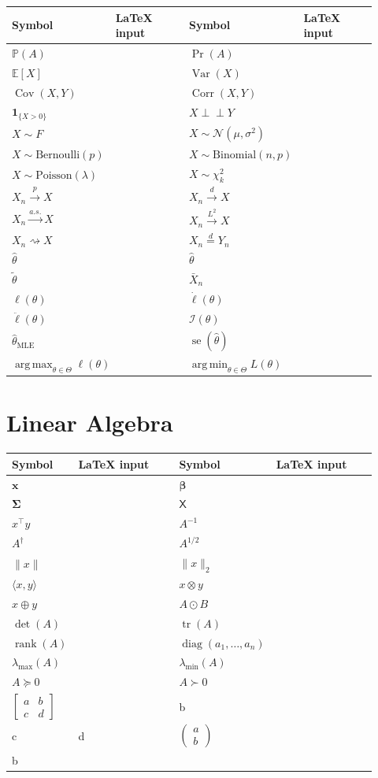 \documentclass[10pt]{article}
\DeclareMathOperator{\Var}{Var}
\DeclareMathOperator{\Cov}{Cov}
\DeclareMathOperator{\Corr}{Corr}
\DeclareMathOperator{\diag}{diag}
\DeclareMathOperator{\rank}{rank}
\DeclareMathOperator{\tr}{tr}
\DeclareMathOperator{\se}{se}
\DeclareMathOperator*{\argmax}{arg\,max}
\DeclareMathOperator*{\argmin}{arg\,min}
\newcommand{\indep}{\mathrel{\perp\!\!\!\perp}}
\newcommand{\code}[1]{\texttt{\detokenize{#1}}}
\newcommand{\srow}[4]{$#1$ & \code{#2} & $#3$ & \code{#4}\\}
\newenvironment{symtable}
{\small\begin{longtable}{
  >{\centering\arraybackslash}p{0.12\linewidth}
  >{\raggedright\arraybackslash}p{0.34\linewidth}
  >{\centering\arraybackslash}p{0.12\linewidth}
  >{\raggedright\arraybackslash}p{0.34\linewidth}}
  \toprule
  \textbf{Symbol} & \textbf{LaTeX input} &
  \textbf{Symbol} & \textbf{LaTeX input}\\
  \midrule
  \endhead}
{\bottomrule\end{longtable}}
\begin{document}
\begin{symtable}
\srow{\mathbb{P}(A)}{\mathbb{P}(A)}{\Pr(A)}{\Pr(A)}
\srow{\mathbb{E}[X]}{\mathbb{E}[X]}{\Var(X)}{\Var(X)}
\srow{\Cov(X,Y)}{\Cov(X,Y)}{\Corr(X,Y)}{\Corr(X,Y)}
\srow{\mathbf{1}_{\{X>0\}}}{\mathbf{1}_{\{X>0\}}}{X \indep Y}{X \indep Y}
\srow{X \sim F}{X \sim F}{X \sim \mathcal{N}(\mu,\sigma^2)}{X \sim \mathcal{N}(\mu,\sigma^2)}
\srow{X \sim \mathrm{Bernoulli}(p)}{X \sim \mathrm{Bernoulli}(p)}{X \sim \mathrm{Binomial}(n,p)}{X \sim \mathrm{Binomial}(n,p)}
\srow{X \sim \mathrm{Poisson}(\lambda)}{X \sim \mathrm{Poisson}(\lambda)}{X \sim \chi^2_k}{X \sim \chi^2_k}
\srow{X_n \xrightarrow{p} X}{X_n \xrightarrow{p} X}{X_n \xrightarrow{d} X}{X_n \xrightarrow{d} X}
\srow{X_n \xrightarrow{a.s.} X}{X_n \xrightarrow{a.s.} X}{X_n \overset{L^2}{\longrightarrow} X}{X_n \overset{L^2}{\longrightarrow} X}
\srow{X_n \rightsquigarrow X}{X_n \rightsquigarrow X}{X_n \overset{d}{=} Y_n}{X_n \overset{d}{=} Y_n}
\srow{\hat{\theta}}{\hat{\theta}}{\widehat{\theta}}{\widehat{\theta}}
\srow{\tilde{\theta}}{\tilde{\theta}}{\bar{X}_n}{\bar{X}_n}
\srow{\ell(\theta)}{\ell(\theta)}{\dot{\ell}(\theta)}{\dot{\ell}(\theta)}
\srow{\ddot{\ell}(\theta)}{\ddot{\ell}(\theta)}{\mathcal{I}(\theta)}{\mathcal{I}(\theta)}
\srow{\hat{\theta}_{\mathrm{MLE}}}{\hat{\theta}_{\mathrm{MLE}}}{\se(\hat{\theta})}{\se(\hat{\theta})}
\srow{\argmax_{\theta\in\Theta}\ell(\theta)}{\argmax_{\theta\in\Theta}\ell(\theta)}{\argmin_{\theta\in\Theta} L(\theta)}{\argmin_{\theta\in\Theta} L(\theta)}
\end{symtable}

\section*{Linear Algebra}

\begin{symtable}
\srow{\mathbf{x}}{\mathbf{x}}{\bm{\beta}}{\bm{\beta}}
\srow{\boldsymbol{\Sigma}}{\boldsymbol{\Sigma}}{\mathsf{X}}{\mathsf{X}}
\srow{x^\top y}{x^\top y}{A^{-1}}{A^{-1}}
\srow{A^\dagger}{A^\dagger}{A^{1/2}}{A^{1/2}}
\srow{\|x\|}{\|x\|}{\lVert x\rVert_2}{\lVert x\rVert_2}
\srow{\langle x,y\rangle}{\langle x,y\rangle}{x \otimes y}{x \otimes y}
\srow{x \oplus y}{x \oplus y}{A \odot B}{A \odot B}
\srow{\det(A)}{\det(A)}{\tr(A)}{\tr(A)}
\srow{\rank(A)}{\rank(A)}{\diag(a_1,\ldots,a_n)}{\diag(a_1,\ldots,a_n)}
\srow{\lambda_{\max}(A)}{\lambda_{\max}(A)}{\lambda_{\min}(A)}{\lambda_{\min}(A)}
\srow{A \succeq 0}{A \succeq 0}{A \succ 0}{A \succ 0}
\srow{\begin{bmatrix}a&b\\c&d\end{bmatrix}}{\begin{bmatrix}a&b\\c&d\end{bmatrix}}{\begin{pmatrix}a\\b\end{pmatrix}}{\begin{pmatrix}a\\b\end{pmatrix}}
\end{symtable}
\end{document}
